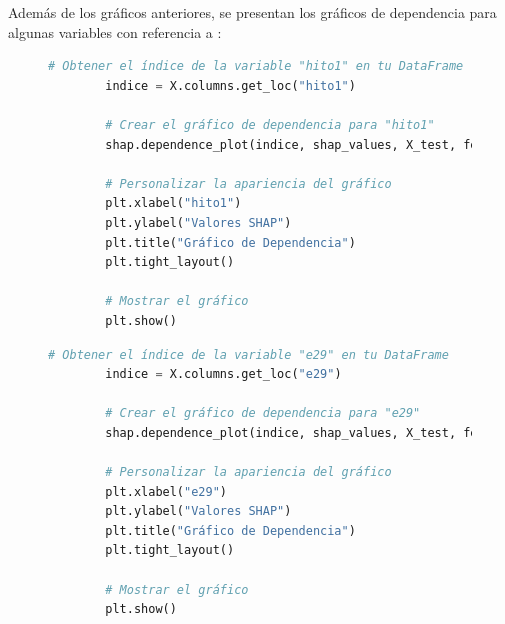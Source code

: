 Además de los gráficos anteriores, se presentan los gráficos de dependencia para algunas variables con referencia a :

\begin{figure}[H]
    \centering
    \begin{minipage}{0.48\textwidth}
        \begin{lstlisting}[language=Python, caption=Grafico de dependencia hito1, label=lst:grafDepHito1]
        # Obtener el índice de la variable "hito1" en tu DataFrame
        indice = X.columns.get_loc("hito1")
        
        # Crear el gráfico de dependencia para "hito1"
        shap.dependence_plot(indice, shap_values, X_test, feature_names=X.columns, show=False)
        
        # Personalizar la apariencia del gráfico
        plt.xlabel("hito1")
        plt.ylabel("Valores SHAP")
        plt.title("Gráfico de Dependencia")
        plt.tight_layout()
        
        # Mostrar el gráfico
        plt.show()
        \end{lstlisting}
    \end{minipage}
    \hfill
    \begin{minipage}{0.48\textwidth}
        \begin{lstlisting}[language=Python, caption=Grafico de dependencia e29, label=lst:grafDepE29]
        # Obtener el índice de la variable "e29" en tu DataFrame
        indice = X.columns.get_loc("e29")
        
        # Crear el gráfico de dependencia para "e29"
        shap.dependence_plot(indice, shap_values, X_test, feature_names=X.columns, show=False)
        
        # Personalizar la apariencia del gráfico
        plt.xlabel("e29")
        plt.ylabel("Valores SHAP")
        plt.title("Gráfico de Dependencia")
        plt.tight_layout()
        
        # Mostrar el gráfico
        plt.show()
        \end{lstlisting}
    \end{minipage}
\end{figure}

